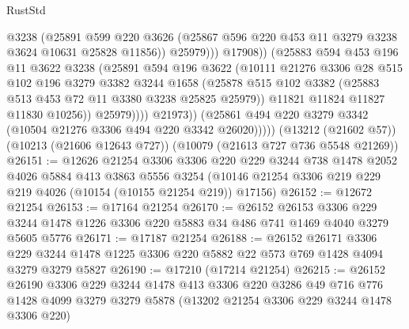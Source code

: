 \begin{lexlean}{RustStd}
\begin{coremodule}
{\begin{coremodule}
{{{{{{{{{{{{{{{{{{{{{{{{{{                              @3238
                              (@25891
                                @599
                                @220
                                @3626
                                (@25867 @596 @220 @453 @11 @3279 @3238 @3624 @10631 @25828 @11856))
                              @25979)))
                        @17908))
                    (@25883
                      @594
                      @453
                      @196
                      @11
                      @3622
                      @3238
                      (@25891
                        @594
                        @196
                        @3622
                        (@10111
                          @21276
                          @3306
                          @28
                          @515
                          @102
                          @196
                          @3279
                          @3382
                          @3244
                          @1658
                          (@25878
                            @515
                            @102
                            @3382
                            (@25883 @513 @453 @72 @11 @3380 @3238 @25825 @25979))
                          @11821
                          @11824
                          @11827
                          @11830
                          @10256))
                      @25979))))
              @21973))
          (@25861 @494 @220 @3279 @3342 (@10504 @21276 @3306 @494 @220 @3342 @26020)))))
    (@13212 (@21602 @57))
    (@10213 (@21606 @12643 @727))
    (@10079 (@21613 @727 @736 @5548 @21269))
@26151 := @12626
    @21254
    @3306
    @3306
    @220
    @229
    @3244
    @738
    @1478
    @2052
    @4026
    @5884
    @413
    @3863
    @5556
    @3254
    (@10146 @21254 @3306 @219 @229 @219 @4026 (@10154 (@10155 @21254 @219)) @17156)
@26152 := @12672 @21254
@26153 := @17164 @21254
@26170 := @26152
    @26153
    @3306
    @229
    @3244
    @1478
    @1226
    @3306
    @220
    @5883
    @34
    @486
    @741
    @1469
    @4040
    @3279
    @5605
    @5776
@26171 := @17187 @21254
@26188 := @26152
    @26171
    @3306
    @229
    @3244
    @1478
    @1225
    @3306
    @220
    @5882
    @22
    @573
    @769
    @1428
    @4094
    @3279
    @3279
    @5827
@26190 := @17210 (@17214 @21254)
@26215 := @26152
    @26190
    @3306
    @229
    @3244
    @1478
    @413
    @3306
    @220
    @3286
    @49
    @716
    @776
    @1428
    @4099
    @3279
    @3279
    @5878
    (@13202 @21254 @3306 @229 @3244 @1478 @3306 @220)
}}}}}}}}}}}}}}}}}}}}}}}}}}
\end{coremodule}}
\end{coremodule}
\end{lexlean}
